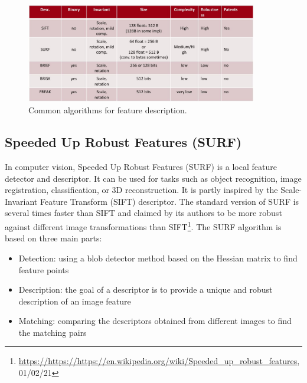 \begin{figure}[h!]
    \centering
    \includegraphics[width=0.9\textwidth]{images/Descriptors.jpg}
    \caption{Common algorithms for feature description.}
    \label{fig:descriptors}    
\end{figure}


\subsection{Speeded Up Robust Features (SURF)}
In computer vision, Speeded Up Robust Features (SURF) is a local feature detector and descriptor. It can be used for tasks such as object recognition, image registration, classification, or 3D reconstruction. It is partly inspired by the Scale-Invariant Feature Transform (SIFT) descriptor. The standard version of SURF is several times faster than SIFT and claimed by its authors to be more robust against different image transformations than SIFT\footnote{\url{https://https://https://en.wikipedia.org/wiki/Speeded_up_robust_features}, 01/02/21}. The SURF algorithm is based on three main parts:
\begin{itemize}
\item Detection: using a blob detector method based on the Hessian matrix to find feature points
\item Description: the goal of a descriptor is to provide a unique and robust description of an image feature
\item Matching: comparing the descriptors obtained from different images to find the matching pairs
\end{itemize}




